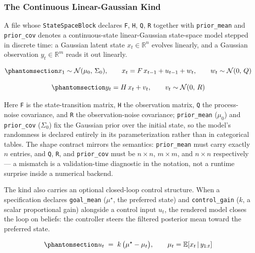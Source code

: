 \documentclass[
  english,
  9pt,
]{extarticle}
\begin{document}
\subsubsection{The Continuous Linear-Gaussian
Kind}\label{the-continuous-linear-gaussian-kind}

A file whose \texttt{StateSpaceBlock} declares \texttt{F}, \texttt{H},
\texttt{Q}, \texttt{R} together with \texttt{prior\_mean} and
\texttt{prior\_cov} denotes a continuous-state linear-Gaussian
state-space model stepped in discrete time: a Gaussian latent state
\(x_t \in \mathbb{R}^n\) evolves linearly, and a Gaussian observation
\(y_t \in \mathbb{R}^m\) reads it out linearly.

\begin{equation}\protect\phantomsection\label{eq:lgssm_state}{
x_1 \sim \mathcal{N}(\mu_0,\, \Sigma_0), \qquad x_t = F\, x_{t-1} + u_{t-1} + w_t, \qquad w_t \sim \mathcal{N}(0,\, Q)
}\end{equation}

\begin{equation}\protect\phantomsection\label{eq:lgssm_obs}{
y_t = H\, x_t + v_t, \qquad v_t \sim \mathcal{N}(0,\, R)
}\end{equation}

Here \texttt{F} is the state-transition matrix, \texttt{H} the
observation matrix, \texttt{Q} the process-noise covariance, and
\texttt{R} the observation-noise covariance; \texttt{prior\_mean}
(\(\mu_0\)) and \texttt{prior\_cov} (\(\Sigma_0\)) fix the Gaussian
prior over the initial state, so the model's randomness is declared
entirely in its parameterization rather than in categorical tables. The
shape contract mirrors the semantics: \texttt{prior\_mean} must carry
exactly \(n\) entries, and \texttt{Q}, \texttt{R}, and
\texttt{prior\_cov} must be \(n \times n\), \(m \times m\), and
\(n \times n\) respectively --- a mismatch is a validation-time
diagnostic in the notation, not a runtime surprise inside a numerical
backend.

The kind also carries an optional closed-loop control structure. When a
specification declares \texttt{goal\_mean} (\(\mu^\star\), the preferred
state) and \texttt{control\_gain} (\(k\), a scalar proportional gain)
alongside a control input \(u_t\), the rendered model closes the loop on
beliefs: the controller steers the filtered posterior mean toward the
preferred state.

\begin{equation}\protect\phantomsection\label{eq:closed_loop}{
u_t \;=\; k \,\bigl(\mu^\star - \mu_t\bigr), \qquad \mu_t = \mathbb{E}\!\left[x_t \,\middle|\, y_{1:t}\right]
}\end{equation}
\end{document}
